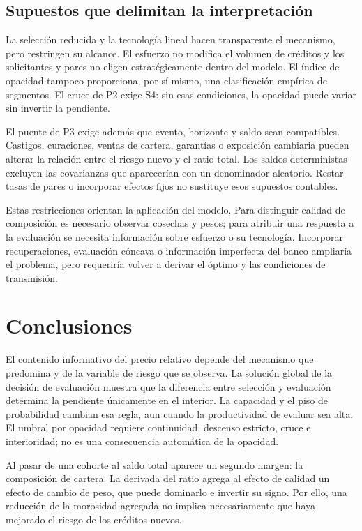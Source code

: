 \documentclass[11pt]{article}
\theoremstyle{definition}\newtheorem{assumption}{Supuesto}
\begin{document}
\subsection{Supuestos que delimitan la interpretación}
La selección reducida y la tecnología lineal hacen transparente el mecanismo,
pero restringen su alcance. El esfuerzo no modifica el volumen de créditos y
los solicitantes y pares no eligen estratégicamente dentro del modelo. El
índice de opacidad tampoco proporciona, por sí mismo, una clasificación empírica
de segmentos. El cruce de P2 exige S4: sin esas condiciones, la opacidad puede
variar sin invertir la pendiente.

El puente de P3 exige además que evento, horizonte y saldo sean compatibles.
Castigos, curaciones, ventas de cartera, garantías o exposición cambiaria
pueden alterar la relación entre el riesgo nuevo y el ratio total. Los saldos
deterministas excluyen las covarianzas que aparecerían con un denominador
aleatorio. Restar tasas de pares o incorporar efectos fijos no sustituye esos
supuestos contables.

Estas restricciones orientan la aplicación del modelo. Para distinguir calidad
de composición es necesario observar cosechas y pesos; para atribuir una
respuesta a la evaluación se necesita información sobre esfuerzo o su
tecnología. Incorporar recuperaciones, evaluación cóncava o información
imperfecta del banco ampliaría el problema, pero requeriría volver a derivar
el óptimo y las condiciones de transmisión.

\section{Conclusiones}
El contenido informativo del precio relativo depende del mecanismo que
predomina y de la variable de riesgo que se observa. La solución global de la
decisión de evaluación muestra que la diferencia entre selección y evaluación
determina la pendiente únicamente en el interior. La capacidad y el piso de
probabilidad cambian esa regla, aun cuando la productividad de evaluar sea alta.
El umbral por opacidad requiere continuidad, descenso estricto, cruce e
interioridad; no es una consecuencia automática de la opacidad.

Al pasar de una cohorte al saldo total aparece un segundo margen: la
composición de cartera. La derivada del ratio agrega al efecto de calidad un
efecto de cambio de peso, que puede dominarlo e invertir su signo. Por ello,
una reducción de la morosidad agregada no implica necesariamente que haya
mejorado el riesgo de los créditos nuevos.
\end{document}
